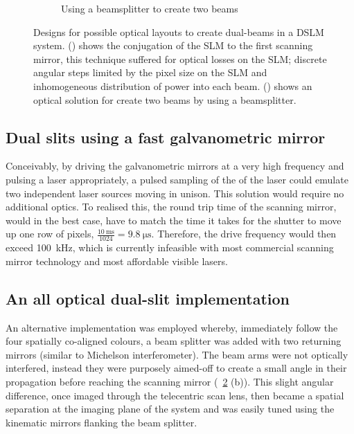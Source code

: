\begin{figure}
\begin{subfigure}[t]{0.3\textwidth}
         \caption{Using a beamsplitter to create two beams}\label{fig:dual_beam_layout/beamsplitter}
    \end{subfigure}%
    \caption[Designs for each optical layout to create dual-beams in a light sheet system]{Designs for possible optical layouts to create dual-beams in a \gls{DSLM} system.
    () shows the conjugation of the \gls{SLM} to the first scanning mirror, this technique suffered for optical losses on the \gls{SLM}; discrete angular steps limited by the pixel size on the \gls{SLM} and inhomogeneous distribution of power into each beam.
    () shows an optical solution for create two beams by using a beamsplitter.
    }
    \label{fig:dual_beam_layouts}
\end{figure}

\subsection{Dual slits using a fast galvanometric mirror}

Conceivably, by driving the galvanometric mirrors at a very high frequency and pulsing a laser appropriately, a pulsed sampling of the of the laser could emulate two independent laser sources moving in unison.
This solution would require no additional optics.
To realised this, the round trip time of the scanning mirror, would in the best case, have to match the time it takes for the shutter to move up one row of pixels, $\frac{\SI{10}{\milli\second}}{1024}=\SI{9.8}{\micro\second}$.
Therefore, the drive frequency would then exceed \SI{100}{\kilo\hertz}, which is currently infeasible with most commercial scanning mirror technology and most affordable visible lasers.

\subsection{An all optical dual-slit implementation}

An alternative implementation was employed whereby, immediately follow the four spatially co-aligned colours, a beam splitter was added with two returning mirrors (similar to Michelson interferometer).
The beam arms were not optically interfered, instead they were purposely aimed-off to create a small angle in their propagation before reaching the scanning mirror (\figurename~\ref{fig:dual_beam_layouts} (b)).
This slight angular difference, once imaged through the telecentric scan lens, then became a spatial separation at the imaging plane of the system and was easily tuned using the kinematic mirrors flanking the beam splitter.

